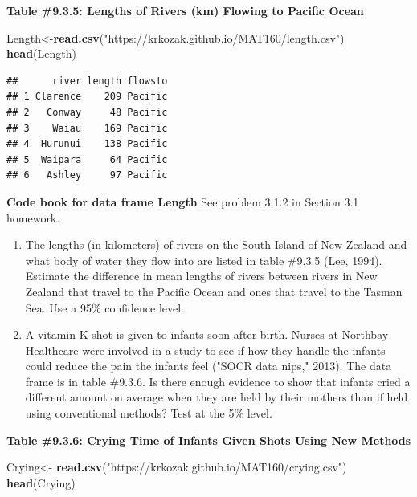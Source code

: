 \documentclass[]{book}
\newenvironment{Shaded}{\begin{snugshade}}{\end{snugshade}}
\newcommand{\KeywordTok}[1]{\textcolor[rgb]{0.13,0.29,0.53}{\textbf{#1}}}
\newcommand{\NormalTok}[1]{#1}
\newcommand{\StringTok}[1]{\textcolor[rgb]{0.31,0.60,0.02}{#1}}
\begin{document}
\textbf{Table \#9.3.5: Lengths of Rivers (km) Flowing to Pacific Ocean}

\begin{Shaded}
\begin{Highlighting}[]
\NormalTok{Length<-}\KeywordTok{read.csv}\NormalTok{(}\StringTok{"https://krkozak.github.io/MAT160/length.csv"}\NormalTok{)}
\KeywordTok{head}\NormalTok{(Length)}
\end{Highlighting}
\end{Shaded}

\begin{verbatim}
##      river length flowsto
## 1 Clarence    209 Pacific
## 2   Conway     48 Pacific
## 3    Waiau    169 Pacific
## 4  Hurunui    138 Pacific
## 5  Waipara     64 Pacific
## 6   Ashley     97 Pacific
\end{verbatim}

\textbf{Code book for data frame Length} See problem 3.1.2 in Section 3.1 homework.

\begin{enumerate}
\def\labelenumi{\arabic{enumi}.}
\setcounter{enumi}{5}
\item
  The lengths (in kilometers) of rivers on the South Island of New Zealand and what body of water they flow into are listed in table \#9.3.5 (Lee, 1994). Estimate the difference in mean lengths of rivers between rivers in New Zealand that travel to the Pacific Ocean and ones that travel to the Tasman Sea. Use a 95\% confidence level.
\item
  A vitamin K shot is given to infants soon after birth. Nurses at Northbay Healthcare were involved in a study to see if how they handle the infants could reduce the pain the infants feel ("SOCR data nips," 2013). The data frame is in table \#9.3.6. Is there enough evidence to show that infants cried a different amount on average when they are held by their mothers than if held using conventional methods? Test at the 5\% level.
\end{enumerate}

\textbf{Table \#9.3.6: Crying Time of Infants Given Shots Using New Methods}

\begin{Shaded}
\begin{Highlighting}[]
\NormalTok{Crying<-}\StringTok{ }\KeywordTok{read.csv}\NormalTok{(}\StringTok{"https://krkozak.github.io/MAT160/crying.csv"}\NormalTok{)}
\KeywordTok{head}\NormalTok{(Crying)}
\end{Highlighting}
\end{Shaded}
\end{document}
